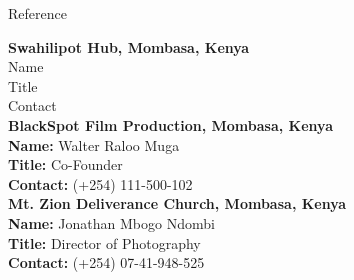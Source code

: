\documentclass[
	11pt, %
]{resume} %
\begin{document}

\begin{rSection}{Reference}

	\textbf{Swahilipot Hub, Mombasa, Kenya}\\
	Name\\
	Title\\
	Contact \smallskip \\
	\textbf{BlackSpot Film Production, Mombasa, Kenya}\\
	\textbf{Name:} Walter Raloo Muga\\
	\textbf{Title:} Co-Founder\\
	\textbf{Contact:} (+254) 111-500-102\smallskip \\
	\textbf{Mt. Zion Deliverance Church, Mombasa, Kenya}\\
	\textbf{Name:} Jonathan Mbogo Ndombi\\
	\textbf{Title:} Director of Photography\\
	\textbf{Contact:} (+254) 07-41-948-525 \smallskip \\
	

\end{rSection}

\end{document}
